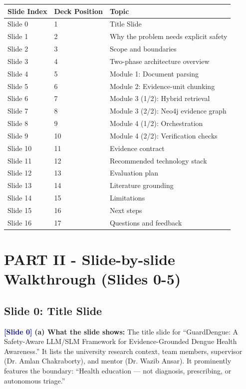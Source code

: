 \documentclass[11pt,a4paper]{article}
\newcommand{\origintag}[2]{\textcolor{#1}{\small\textbf{[#2]}}}
\begin{document}
\begin{table}[ht]
\centering
{}
\begin{tabular}{lll}
\toprule
\textbf{Slide Index} & \textbf{Deck Position} & \textbf{Topic} \\
\midrule
Slide 0 & 1 & Title Slide \\
Slide 1 & 2 & Why the problem needs explicit safety \\
Slide 2 & 3 & Scope and boundaries \\
Slide 3 & 4 & Two-phase architecture overview \\
Slide 4 & 5 & Module 1: Document parsing \\
Slide 5 & 6 & Module 2: Evidence-unit chunking \\
Slide 6 & 7 & Module 3 (1/2): Hybrid retrieval \\
Slide 7 & 8 & Module 3 (2/2): Neo4j evidence graph \\
Slide 8 & 9 & Module 4 (1/2): Orchestration \\
Slide 9 & 10 & Module 4 (2/2): Verification checks \\
Slide 10 & 11 & Evidence contract \\
Slide 11 & 12 & Recommended technology stack \\
Slide 12 & 13 & Evaluation plan \\
Slide 13 & 14 & Literature grounding \\
Slide 14 & 15 & Limitations \\
Slide 15 & 16 & Next steps \\
Slide 16 & 17 & Questions and feedback \\
\bottomrule
\end{tabular}
\end{table}

\newpage
\section{PART II - Slide-by-slide Walkthrough (Slides 0-5)}

\subsection{Slide 0: Title Slide}
\origintag{navy}{Slide 0} 
\textbf{(a) What the slide shows:} The title slide for ``GuardDengue: A Safety-Aware LLM/SLM Framework for Evidence-Grounded Dengue Health Awareness.'' It lists the university research context, team members, supervisor (Dr. Amlan Chakraborty), and mentor (Dr. Wazib Ansar). It prominently features the boundary: ``Health education --- not diagnosis, prescribing, or autonomous triage.''
\end{document}
